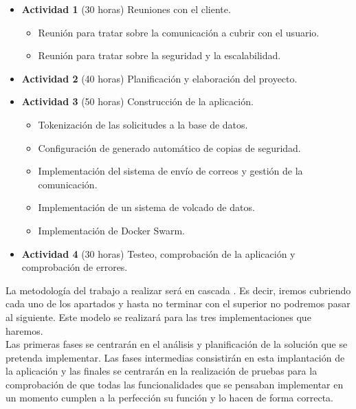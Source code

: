 \begin{itemize}
    \item \textbf{Actividad 1} (30 horas) Reuniones con el cliente.
          \begin{itemize}
              \item Reunión para tratar sobre la comunicación a cubrir con el usuario.
              \item Reunión para tratar sobre la seguridad y la escalabilidad.
          \end{itemize}
    \item \textbf{Actividad 2} (40 horas) Planificación y elaboración del proyecto.
    \item \textbf{Actividad 3} (50 horas) Construcción de la aplicación.
          \begin{itemize}
              \item Tokenización de las solicitudes a la base de datos.
              \item Configuración de generado automático de copias de seguridad.
              \item Implementación del sistema de envío de correos y gestión de la comunicación.
              \item Implementación de un sistema de volcado de datos.
              \item Implementación de Docker Swarm.
          \end{itemize}
    \item \textbf{Actividad 4} (30 horas) Testeo, comprobación de la aplicación y comprobación de errores.
\end{itemize}

La metodología del trabajo a realizar será en cascada \cite{waterfall-vs-agile}. Es decir, iremos cubriendo cada uno de los apartados y hasta no terminar con el superior no podremos pasar al siguiente. Este modelo se realizará para las tres implementaciones que haremos.
\\Las primeras fases se centrarán en el análisis y planificación de la solución que se pretenda implementar. Las fases intermedias consistirán en esta implantación de la aplicación y las finales se centrarán en la realización de pruebas para la comprobación de que todas las funcionalidades que se pensaban implementar en un momento cumplen a la perfección su función y lo hacen de forma correcta.